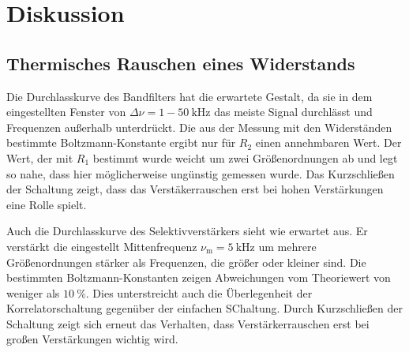 \section{Diskussion}
\label{sec:Diskussion}

\subsection{Thermisches Rauschen eines Widerstands}

Die Durchlasskurve des Bandfilters hat die erwartete Gestalt, da sie in dem eingestellten Fenster von $\Delta \nu = 1-\SI{50}{\kilo\hertz}$ das meiste Signal durchlässt und Frequenzen außerhalb unterdrückt.
Die aus der Messung mit den Widerständen bestimmte Boltzmann-Konstante ergibt nur für $R_2$ einen annehmbaren Wert. Der Wert, der mit $R_1$ bestimmt wurde weicht um zwei Größenordnungen ab und legt so nahe, dass hier möglicherweise ungünstig gemessen wurde.
Das Kurzschließen der Schaltung zeigt, dass das Verstäkerrauschen erst bei hohen Verstärkungen eine Rolle spielt.

Auch die Durchlasskurve des Selektivverstärkers sieht wie erwartet aus. Er verstärkt die eingestellt Mittenfrequenz $\nu_\text{m} = \SI{5}{\kilo\hertz}$ um mehrere Größenordnungen stärker als Frequenzen, die größer oder kleiner sind.
Die bestimmten Boltzmann-Konstanten zeigen Abweichungen vom Theoriewert von weniger als $\SI{10}{\percent}$. Dies unterstreicht auch die Überlegenheit der Korrelatorschaltung gegenüber der einfachen SChaltung. Durch Kurzschließen der Schaltung zeigt sich erneut das Verhalten, dass Verstärkerrauschen erst bei großen Verstärkungen wichtig wird.
